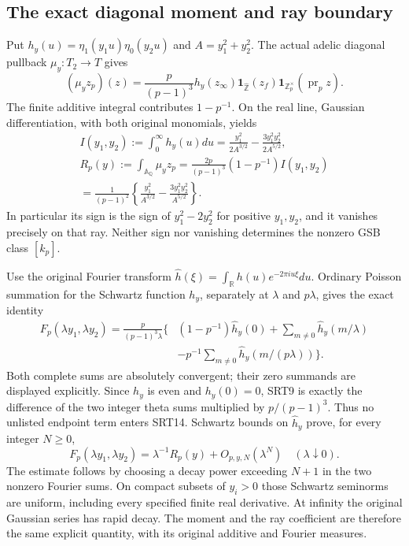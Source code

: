 \subsection{The exact diagonal moment and ray boundary}
Put $h_y(u)=\eta_1(y_1u)\eta_0(y_2u)$ and $A=y_1^2+y_2^2$.
The actual adelic diagonal pullback $\mu_y:T_2\to T$ gives
\begin{equation}\tag{SRT12}
(\mu_yz_p)(z)=\frac{p}{(p-1)^3}h_y(z_\infty)
   \mathbf1_{\widehat{\mathbb Z}}(z_f)
   \mathbf1_{\mathbb Z_p^\times}(\operatorname{pr}_p z).
\end{equation}
The finite additive integral contributes $1-p^{-1}$. On the real
line, Gaussian differentiation, with both original monomials, yields
\begin{equation}\tag{SRT13}
\begin{gathered}
I(y_1,y_2):=\int_0^\infty h_y(u)du
 =\frac{y_1^2}{2A^{3/2}}-\frac{3y_1^2y_2^2}{2A^{5/2}},\\
R_p(y):=\int_{\mathbb A_\mathbb Q}\mu_yz_p
 =\frac{2p}{(p-1)^3}(1-p^{-1})I(y_1,y_2)\\
 =\frac1{(p-1)^2}
       \left\{\frac{y_1^2}{A^{3/2}}
                      -\frac{3y_1^2y_2^2}{A^{5/2}}\right\}.
\end{gathered}
\end{equation}
In particular its sign is the sign of $y_1^2-2y_2^2$ for positive
$y_1,y_2$, and it vanishes precisely on that ray. Neither sign
nor vanishing determines the nonzero GSB class $[k_p]$.

Use the original Fourier transform
$\widehat h(\xi)=\int_\mathbb R h(u)e^{-2\pi i u\xi}du$.
Ordinary Poisson summation for the Schwartz function $h_y$, separately
at $\lambda$ and $p\lambda$, gives the exact identity
\begin{equation}\tag{SRT14}
\begin{split}
F_p(\lambda y_1,\lambda y_2)
=\frac{p}{(p-1)^3\lambda}\bigg\{&(1-p^{-1})\widehat h_y(0)
       +\sum_{m\ne0}\widehat h_y(m/\lambda)\\
       &-p^{-1}\sum_{m\ne0}\widehat h_y(m/(p\lambda))\bigg\}.
\end{split}
\end{equation}
Both complete sums are absolutely convergent; their zero summands are
displayed explicitly. Since $h_y$ is even and $h_y(0)=0$, SRT9 is
exactly the difference of the two integer theta sums multiplied by
$p/(p-1)^3$. Thus no unlisted endpoint term enters SRT14.
Schwartz bounds on $\widehat h_y$ prove, for every integer $N\ge0$,
\begin{equation}\tag{SRT15}
F_p(\lambda y_1,\lambda y_2)
 =\lambda^{-1}R_p(y)+O_{p,y,N}(\lambda^N)
 \quad(\lambda\downarrow0).
\end{equation}
The estimate follows by choosing a decay power exceeding $N+1$ in
the two nonzero Fourier sums. On compact subsets of $y_i>0$ those
Schwartz seminorms are uniform, including every specified finite
real derivative. At infinity the original Gaussian series has rapid
decay. The moment and the ray coefficient are therefore the same
explicit quantity, with its original additive and Fourier measures.

